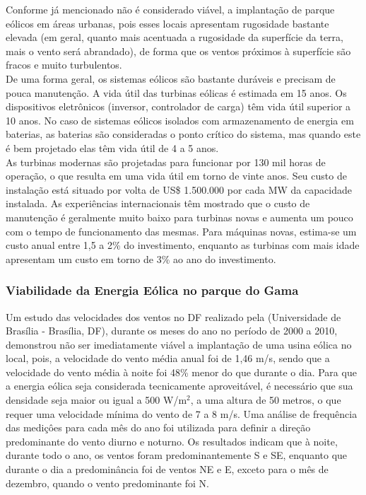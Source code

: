 Conforme j\'a mencionado  n\~ao \'e considerado vi\'avel, a implanta\c{c}\~ao de parque e\'olicos em \'areas urbanas, pois esses locais  apresentam rugosidade bastante elevada (em geral, quanto mais acentuada a rugosidade da superf\'icie da terra, mais o vento ser\'a abrandado), de forma que os ventos pr\'oximos \`a superf\'icie s\~ao fracos e muito turbulentos. \\ De uma forma geral, os sistemas e\'olicos s\~ao bastante dur\'aveis e precisam de pouca manuten\c{c}\~ao. A vida \'util das turbinas e\'olicas \'e estimada em 15 anos. Os dispositivos eletr\^onicos (inversor, controlador de carga) t\^em vida \'util superior a 10 anos. No caso de sistemas e\'olicos isolados com armazenamento de energia em baterias, as baterias s\~ao consideradas o ponto cr\'itico do sistema, mas quando este \'e bem projetado elas t\^em vida \'util de 4 a 5 anos. \\ As turbinas modernas s\~ao projetadas para funcionar por 130 mil horas de opera\c{c}\~ao, o que resulta em uma vida \'util em torno de vinte anos. Seu custo de instala\c{c}\~ao est\'a situado por volta de US\$ 1.500.000 por cada MW da capacidade instalada. As experi\^encias internacionais t\^em mostrado que o custo de manuten\c{c}\~ao \'e geralmente muito baixo para turbinas novas e aumenta um pouco com o tempo de funcionamento das mesmas. Para m\'aquinas novas, estima-se um custo anual entre 1,5 a 2\% do investimento, enquanto as turbinas com mais idade apresentam um custo em torno de 3\% ao ano do investimento. \\

\subsubsection{Viabilidade da Energia E\'olica no parque do Gama}

Um estudo das velocidades dos ventos no DF realizado pela (Universidade de Bras\'ilia - Bras\'ilia, DF), durante os meses do ano no per\'iodo de 2000 a 2010, demonstrou n\~ao ser imediatamente vi\'avel a implanta\c{c}\~ao de uma usina e\'olica no local, pois, a velocidade do vento m\'edia anual foi de 1,46 m/s, sendo que a velocidade do vento m\'edia \`a noite foi 48\% menor do que durante o dia. Para que a energia e\'olica seja considerada tecnicamente aproveit\'avel, \'e necess\'ario que sua densidade seja maior ou igual a 500 W/m$^{2}$, a uma altura de 50 metros, o que requer uma velocidade m\'inima do vento de 7 a 8 m/s. 
Uma an\'alise de frequ\^encia das medi\c{c}\^oes para cada m\^es do ano foi utilizada para definir a dire\c{c}\~ao predominante do vento diurno e noturno. Os resultados indicam que \`a noite, durante todo o ano, os ventos foram predominantemente S e SE, enquanto que durante o dia a predomin\^ancia foi de ventos NE e E, exceto para o m\^es de dezembro, quando o vento predominante foi N. \\


